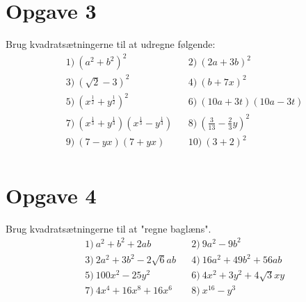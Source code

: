 \section*{Opgave 3}
Brug kvadratsætningerne til at udregne følgende:
\begin{align*}
&1)  \ (a^2+b^2)^2  &&2) \  (2a+3b)^2 \\
&3) \ (\sqrt{2}-3)^2  &&4) \  (b+7x)^2 \\
&5) \ (x^{\frac{1}{2}}+y^{\frac{1}{2}})^2   &&6) \ (10a+3t)(10a-3t)   \\
&7) \ (x^{\frac{1}{3}}+y^{\frac{1}{3}})(x^{\frac{1}{3}}-y^{\frac{1}{3}})  &&8) \ (\frac{3}{13}-\frac{2}{3}y)^2  \\
&9) \ (7-yx)(7+yx)   &&10) \ (3+2)^2   \\
\end{align*}
\section*{Opgave 4}
Brug kvadratsætningerne til at "regne baglæns".
\begin{align*}
&1) \  a^2+b^2+2ab  &&2) \  9a^2-9b^2   \\
&3) \  2a^2+3b^2-2\sqrt{6}ab  &&4) \  16a^2+49b^2+56ab   \\
&5) \   100x^2 - 25y^2  &&6) \   4x^2+3y^2+4\sqrt{3}xy   \\
&7) \  4x^4+16x^8+16x^6  &&8) \ x^{16}-y^{3}     
\end{align*}